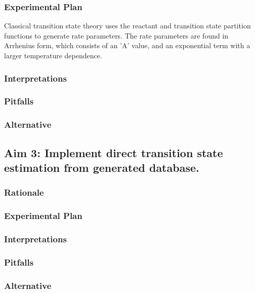 \documentclass[12pt]{article}
\begin{document}
\subsubsection{Experimental Plan}

Classical transition state theory uses the reactant and transition state partition functions to generate rate parameters. The rate parameters are found in Arrhenius form, which consists of an 'A' value, and an exponential term with a larger temperature dependence. 
\subsubsection{Interpretations}
\subsubsection{Pitfalls}
\subsubsection{Alternative}

\subsection{Aim 3: Implement direct transition state estimation from generated database.}
\subsubsection{Rationale}



\subsubsection{Experimental Plan}
\subsubsection{Interpretations}
\subsubsection{Pitfalls}
\subsubsection{Alternative}
\end{document}
